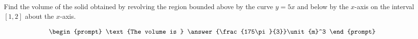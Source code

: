 \documentclass{ximera}
\author{Gregory Hartman \and Matthew Carr}
\begin{document}
\begin{exercise}






Find the volume of the solid obtained by revolving the region bounded above by the curve $y=5x$ and below by the $x$-axis on the interval $[1,2]$ about the $x$-axis.


\[
\begin{prompt}
\text{The volume is } \answer{\frac{175\pi}{3}}\unit{m}^3
\end{prompt}
\]




\end{exercise}
\end{document}
